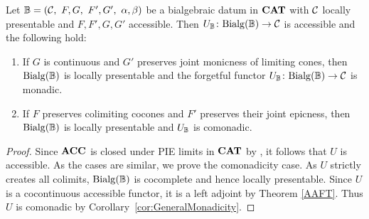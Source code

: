 \begin{theorem}\label{thm:LPandComonadicity}
    Let $\mathbb{B} = (\mathcal{C},\ F,G,\ F',G',\ \alpha,\beta)$ be a bialgebraic datum in $\mathbf{CAT}$ with $\mathcal{C}$ locally presentable and $F,F',G,G'$ accessible. Then $U_{\mathbb{B}}\colon \mathrm{Bialg}(\mathbb{B})\to \mathcal{C}$ is accessible and the following hold:
    \begin{enumerate}
        \item If $G$ is continuous and $G'$ preserves joint monicness of limiting cones, then $\mathrm{Bialg}(\mathbb{B})$ is locally presentable and the forgetful functor $U_{\mathbb{B}}\colon \mathrm{Bialg}(\mathbb{B})\to \mathcal{C}$ is monadic.
        \item If $F$ preserves colimiting cocones and $F'$ preserves their joint epicness, then $\mathrm{Bialg}(\mathbb{B})$ is locally presentable and $U_{\mathbb{B}}$ is comonadic.
    \end{enumerate}
\end{theorem}

\begin{proof}
    Since $\mathbf{ACC}$ is closed under PIE limits in $\mathbf{CAT}$ by \cite[2.72 Theorem, 2.76 Lemma]{LPC}, it follows that $U$ is accessible. As the cases are similar, we prove the comonadicity case.  As $U$ strictly creates all colimits, $\mathrm{Bialg}(\mathbb{B})$ is cocomplete and hence locally presentable. Since $U$ is a cocontinuous accessible functor, it is a left adjoint by Theorem \ref{AAFT}. Thus $U$ is comonadic by Corollary~\ref{cor:GeneralMonadicity}.
\end{proof}
